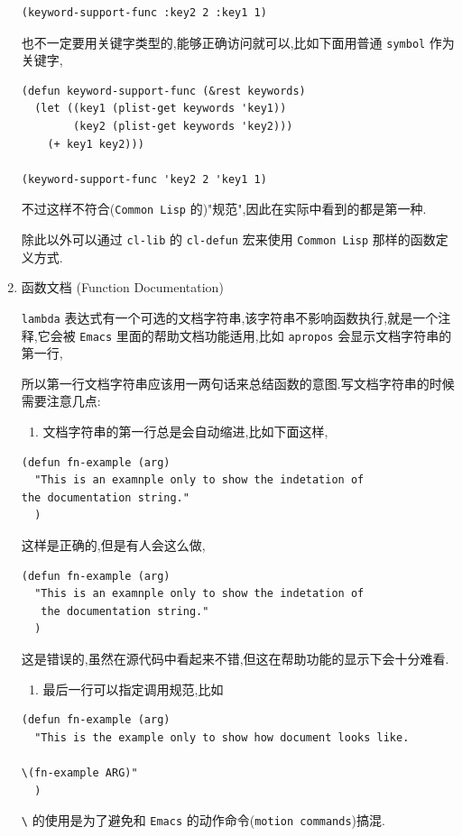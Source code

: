 \documentclass[11pt]{article}
\begin{document}
\begin{enumerate}
\begin{verbatim}
(keyword-support-func :key2 2 :key1 1)
\end{verbatim}

也不一定要用关键字类型的,能够正确访问就可以,比如下面用普通 \texttt{symbol} 作为关键字,

\begin{verbatim}
(defun keyword-support-func (&rest keywords)
  (let ((key1 (plist-get keywords 'key1))
        (key2 (plist-get keywords 'key2)))
    (+ key1 key2)))

(keyword-support-func 'key2 2 'key1 1)
\end{verbatim}

不过这样不符合(\texttt{Common Lisp} 的)"规范",因此在实际中看到的都是第一种.

除此以外可以通过 \texttt{cl-lib} 的 \texttt{cl-defun} 宏来使用 \texttt{Common Lisp} 那样的函数定义方式.


\item 函数文档 (Function Documentation)
\label{sec:org7e15d7f}

\texttt{lambda} 表达式有一个可选的文档字符串,该字符串不影响函数执行,就是一个注释,它会被 \texttt{Emacs} 里面的帮助文档功能适用,比如 \texttt{apropos} 会显示文档字符串的第一行,

所以第一行文档字符串应该用一两句话来总结函数的意图.写文档字符串的时候需要注意几点:

\begin{enumerate}
\item 文档字符串的第一行总是会自动缩进,比如下面这样,
\end{enumerate}

\begin{verbatim}
(defun fn-example (arg)
  "This is an examnple only to show the indetation of
the documentation string."
  )
\end{verbatim}

这样是正确的,但是有人会这么做,

\begin{verbatim}
(defun fn-example (arg)
  "This is an examnple only to show the indetation of
   the documentation string."
  )
\end{verbatim}

这是错误的,虽然在源代码中看起来不错,但这在帮助功能的显示下会十分难看.

\begin{enumerate}
\item 最后一行可以指定调用规范,比如
\end{enumerate}
\begin{verbatim}
(defun fn-example (arg)
  "This is the example only to show how document looks like.

\(fn-example ARG)"
  )
\end{verbatim}

\texttt{\textbackslash{}} 的使用是为了避免和 \texttt{Emacs} 的动作命令(\texttt{motion commands})搞混.
\end{enumerate}
\end{document}
